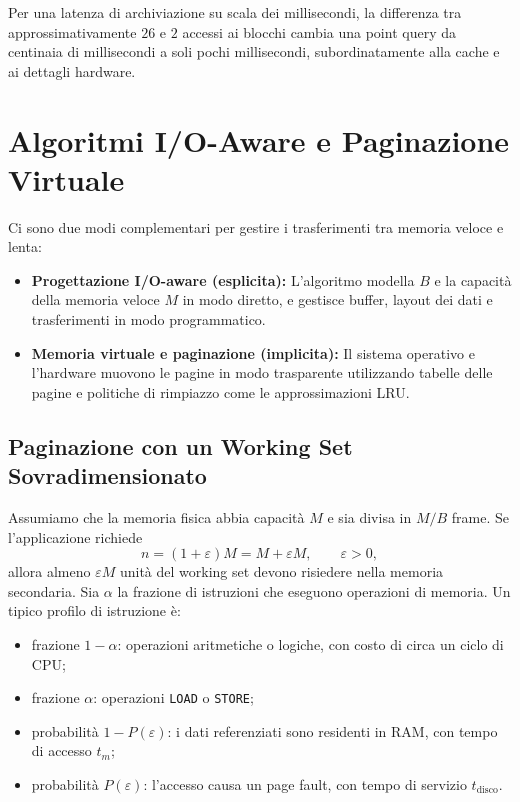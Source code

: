 Per una latenza di archiviazione su scala dei millisecondi, la differenza tra approssimativamente $26$ e $2$ accessi ai blocchi cambia una point query da centinaia di millisecondi a soli pochi millisecondi, subordinatamente alla cache e ai dettagli hardware.

\FloatBarrier
\section{Algoritmi I/O-Aware e Paginazione Virtuale}
\label{sec:paging}

Ci sono due modi complementari per gestire i trasferimenti tra memoria veloce e lenta:
\begin{itemize}
  \item \textbf{Progettazione I/O-aware (esplicita):} L'algoritmo modella $B$ e la capacità della memoria veloce $M$ in modo diretto, e gestisce buffer, layout dei dati e trasferimenti in modo programmatico.
  \item \textbf{Memoria virtuale e paginazione (implicita):} Il sistema operativo e l'hardware muovono le pagine in modo trasparente utilizzando tabelle delle pagine e politiche di rimpiazzo come le approssimazioni LRU.
\end{itemize}

\FloatBarrier
\subsection{Paginazione con un Working Set Sovradimensionato}
\label{subsec:paging-model}

Assumiamo che la memoria fisica abbia capacità $M$ e sia divisa in $M/B$ frame. Se l'applicazione richiede
\[
  n=(1+\varepsilon)M=M+\varepsilon M,
  \qquad \varepsilon>0,
\]
allora almeno $\varepsilon M$ unità del working set devono risiedere nella memoria secondaria. Sia $\alpha$ la frazione di istruzioni che eseguono operazioni di memoria. Un tipico profilo di istruzione è:

\begin{itemize}
  \item frazione $1-\alpha$: operazioni aritmetiche o logiche, con costo di circa un ciclo di CPU;
  \item frazione $\alpha$: operazioni \texttt{LOAD} o \texttt{STORE};
  \item probabilità $1-P(\varepsilon)$: i dati referenziati sono residenti in RAM, con tempo di accesso $t_m$;
  \item probabilità $P(\varepsilon)$: l'accesso causa un page fault, con tempo di servizio $t_{\mathrm{disco}}$.
\end{itemize}

